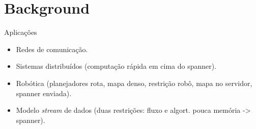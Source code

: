 \documentclass[dvipsnames]{beamer}
\newcommand{\R}{\mathbb{R}}
\begin{document}
\section{Background}



\begin{frame}{Aplicações}
  \begin{itemize}  
  \item Redes de comunicação.
  \item Sistemas distribuídos (computação rápida em cima do spanner).
  \item Robótica (planejadores rota, mapa denso, restrição robô, mapa no servidor, spanner enviada).
  \item Modelo \emph{stream} de dados (duas restrições: fluxo e algort. pouca memória -> spanner).
  \end{itemize}
\end{frame}
\end{document}
